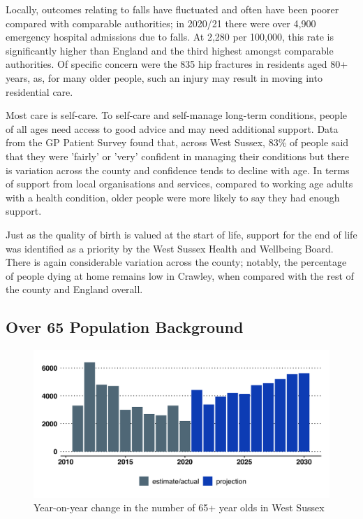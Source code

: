 Locally, outcomes relating to falls have fluctuated and often have been poorer compared with comparable authorities; in 2020/21 there were over 4,900 emergency hospital admissions due to falls. At 2,280 per 100,000, this rate is significantly higher than England and the third highest amongst comparable authorities. Of specific concern were the 835 hip fractures in residents aged 80+ years, as, for many older people, such an injury may result in moving into residential care.

Most care is self-care. To self-care and self-manage long-term conditions, people of all ages need access to good advice and may need additional support. Data from the GP Patient Survey found that, across West Sussex, 83\% of people said that they were 'fairly' or 'very' confident in managing their conditions but there is variation across the county and confidence tends to decline with age. In terms of support from local organisations and services, compared to working age adults with a health condition, older people were more likely to say they had enough support.

Just as the quality of birth is valued at the start of life, support for the end of life was identified as a priority by the West Sussex Health and Wellbeing Board. There is again considerable variation across the county; notably, the percentage of people dying at home remains low in Crawley, when compared with the rest of the county and England overall.

\subsection{Over 65 Population Background}
\begin{figure}
    \caption{Year-on-year change in the number of 65+ year olds in West Sussex}\label{fig:over65deltas}
    \centering
    \includegraphics[width=\linewidth]{images/over65_popn_deltas.png}
\end{figure}

